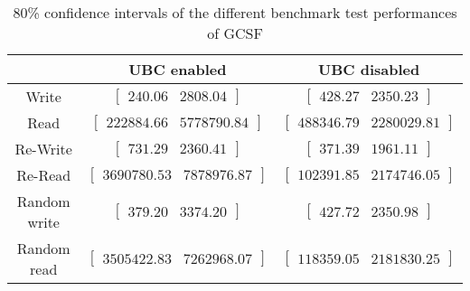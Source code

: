 
	\begin{table}[ht!]
	\caption{80\% confidence intervals of the different benchmark test performances of GCSF}
	\begin{tabular}{| c | c | c |}
	\hline
	{} & \textbf{UBC enabled} & \textbf{UBC disabled} \\
	\hline
	\hline
	Write &$\left[ \begin{array}{rr} 240.06 & 2808.04 \end{array}\right] $ &$\left[ \begin{array}{rr} 428.27 & 2350.23 \end{array}\right] $\\ 
Read &$\left[ \begin{array}{rr} 222884.66 & 5778790.84 \end{array}\right] $ &$\left[ \begin{array}{rr} 488346.79 & 2280029.81 \end{array}\right] $\\ 
Re-Write &$\left[ \begin{array}{rr} 731.29 & 2360.41 \end{array}\right] $ &$\left[ \begin{array}{rr} 371.39 & 1961.11 \end{array}\right] $\\ 
Re-Read &$\left[ \begin{array}{rr} 3690780.53 & 7878976.87 \end{array}\right] $ &$\left[ \begin{array}{rr} 102391.85 & 2174746.05 \end{array}\right] $\\ 
Random write &$\left[ \begin{array}{rr} 379.20 & 3374.20 \end{array}\right] $ &$\left[ \begin{array}{rr} 427.72 & 2350.98 \end{array}\right] $\\ 
Random read &$\left[ \begin{array}{rr} 3505422.83 & 7262968.07 \end{array}\right] $ &$\left[ \begin{array}{rr} 118359.05 & 2181830.25 \end{array}\right] $\\ 

		\hline
		\end{tabular}
		\label{tbl:bootstrap-table-gcsf}
		\end{table}
	